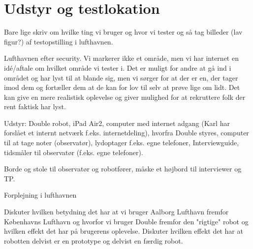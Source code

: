 \section{Udstyr og testlokation}
\label{UdstyrOgTestlokationValgAfGestikker}
%
Bare lige skriv om hvilke ting vi bruger og hvor vi tester og så tag billeder (lav figur?) af testopstilling i lufthavnen. 

Lufthavnen efter security. 
Vi markerer ikke et område, men vi har internet en idé/aftale om hvilket område vi tester i. Det er muligt for andre at gå ind i området og har lyst til at blande sig, men vi sørger for at der er en, der tager imod dem og fortæller dem at de kan for lov til selv at prøve lige om lidt. Det kan give en mere realistisk oplevelse og giver mulighed for at rekruttere folk der rent faktisk har lyst. 

Udstyr: Double robot, iPad Air2, computer med internet adgang (Karl har forslået et internt netværk f.eks. internetdeling), hvorfra Double styres, computer til at tage noter (observatør), lydoptager f.eks. egne telefoner, Interviewguide, tidsmåler til observatør (f.eks. egne telefoner). 

Borde og stole til observatør og robotfører, måske et højbord til interviewer og TP.   

Forplejning i lufthavnen


Diskuter hvilken betydning det har at vi bruger Aalborg Lufthavn fremfor Københavns Lufthavn og hvorfor vi bruger Double fremfor den "rigtige" robot og hvilken effekt det har på brugerens oplevelse. Diskuter hvilken effekt det har at robotten delvist er en prototype og delvist en færdig robot.          

